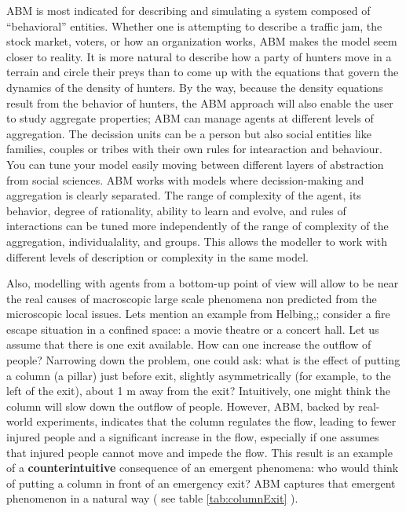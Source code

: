 \documentclass[11pt,oneside,a4paper,openright]{report}
\begin{document}
ABM is most indicated for describing and simulating a system composed of “behavioral” entities. Whether one is attempting to describe a traffic jam, the stock market, voters, or how an organization works, ABM makes the model seem closer to reality. It is more natural to describe how a party of hunters move in a terrain and circle their preys than to come up with the equations that govern the dynamics of the density of hunters. By the way, because the density equations result from the behavior of hunters, the ABM approach will also enable the user to study aggregate properties\cite[p.2]{Bonabeau2002}; ABM can manage agents at different levels of aggregation. The decission units can be a person but also social entities like families, couples or tribes with their own rules for intearaction and behaviour. You can tune your model easily moving between different layers of abstraction from social sciences. ABM works with models where decission-making and aggregation is clearly separated. The range of complexity of the agent, its behavior, degree of rationality, ability to learn and evolve, and rules of interactions can be tuned more independently of the range of complexity of the aggregation, individualality, and groups. This allows the modeller to work with different levels of description or complexity in the same model\cite[p.2]{Bonabeau2002}.

Also, modelling with agents from a bottom-up point of view will allow to be near the real causes of macroscopic large scale phenomena non predicted from the microscopic local issues. 
Lets mention an example from Helbing,\cite{Helbing2000}; consider a fire escape situation in a confined space: a movie theatre or a concert hall. Let us assume that there is one exit available. How can one increase the outflow of people? Narrowing down the problem, one could ask: what is the effect of putting a column (a pillar) just before exit, slightly asymmetrically (for example, to the left of the exit), about 1 m away from the exit? Intuitively, one might think the column will slow down the outflow of people. However, ABM, backed by real-world experiments, indicates that the column regulates the flow, leading to fewer injured people and a significant increase in the flow, especially if one assumes that injured people cannot move and impede the flow. This result is an example of a \textbf{counterintuitive} consequence of an emergent phenomena: who would think of putting a column in front of an emergency exit? ABM captures that emergent phenomenon in a natural way ( see table \ref{tab:columnExit} ).\\
\end{document}
